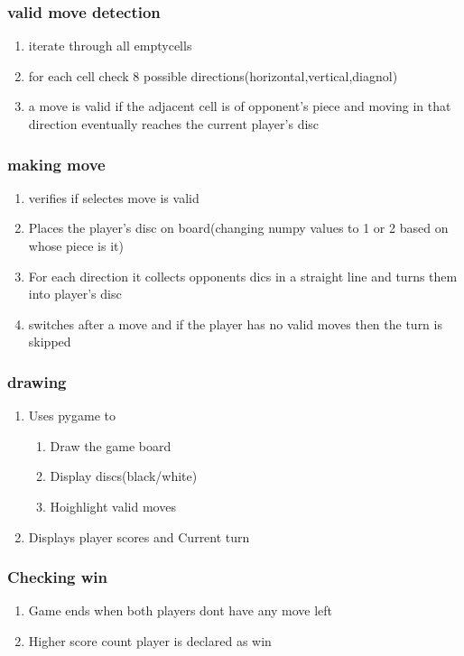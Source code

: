\documentclass{article}
\begin{document}
\subsubsection{valid move detection}
\begin{enumerate}
    \item iterate through all emptycells
    \item for each cell check 8 possible directions(horizontal,vertical,diagnol)
    \item a move is valid if the adjacent cell is of opponent's piece and moving in that direction eventually reaches the current player's disc
\end{enumerate}
\subsubsection{making move}
\begin{enumerate}
    \item verifies if selectes move is valid
    \item Places the player's disc on board(changing numpy values to 1 or 2 based on whose piece is it)
    \item For each direction it collects opponents dics in a straight line and turns them into player's disc
    \item switches after a move and if the player has no valid moves then the turn is skipped
\end{enumerate}
\subsubsection{drawing}
\begin{enumerate}
    \item Uses pygame to\begin{enumerate}
        \item Draw the game board
        \item Display discs(black/white)
        \item Hoighlight valid moves
    \end{enumerate}
    \item Displays player scores and Current turn
\end{enumerate}
\subsubsection{Checking win}
\begin{enumerate}
    \item Game ends when both players dont have any move left
    \item Higher score count player is declared as win
\end{enumerate}
\end{document}
